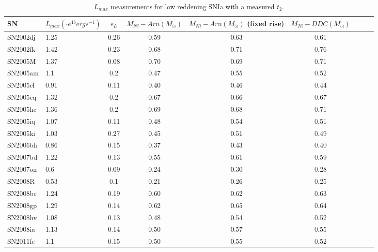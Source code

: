 \begin{table*}
\caption{$L_{max}$ measurements for low reddening SNIa with a measured $t_2$. }

\begin{center}
\begin{tabular}{llccccrrr}
\hline
SN  & $L_{max}(\cdot e^{43} erg s^{-1})$ & $e_{L}$  & $M_{Ni}-Arn (M_{\odot})$  & $M_{Ni}-Arn (M_{\odot})$ (fixed rise)  & $M_{Ni}-DDC (M_{\odot})$\\%
\hline
SN2002dj & 1.25 & 0.26 & 0.59 & 0.63 & 0.61 \\
SN2002fk & 1.42 & 0.23 & 0.68 & 0.71 & 0.76 \\
SN2005M & 1.37 & 0.08 & 0.70 & 0.69 & 0.71 \\
SN2005am & 1.1 & 0.2 & 0.47 & 0.55 & 0.52 \\
SN2005el & 0.91	& 0.11 & 0.40 & 0.46   & 0.44 	\\	
SN2005eq & 1.32 & 0.2 & 0.67 & 0.66 & 0.67 \\
SN2005hc & 1.36 & 0.2 & 0.69 & 0.68 & 0.71 \\
SN2005iq & 1.07 & 0.11 & 0.48 & 0.54 & 0.51 \\
SN2005ki & 1.03 & 0.27 & 0.45 & 0.51 & 0.49 \\
SN2006bh & 0.86 & 0.15 & 0.37 & 0.43 & 0.40 \\
SN2007bd & 1.22 & 0.13 & 0.55	  & 0.61 & 0.59	\\
SN2007on & 0.6 & 0.09 & 0.24 & 0.30 & 0.28 \\
SN2008R & 0.53 & 0.1 & 0.21 & 0.26 & 0.25 \\
SN2008bc & 1.24 & 0.19 & 0.60 & 0.62 & 0.63 \\
SN2008gp & 1.29 & 0.14 & 0.62 & 0.65 & 0.64 \\
SN2008hv & 1.08 & 0.13 & 0.48 & 0.54 & 0.52 \\
SN2008ia & 1.13 & 0.14 & 0.50 & 0.57 & 0.55 \\
SN2011fe & 1.1 & 0.15 & 0.50 & 0.55 & 0.52 \\
\hline
\end{tabular}
\label{tab:mni}
\end{center}
\end{table*}
